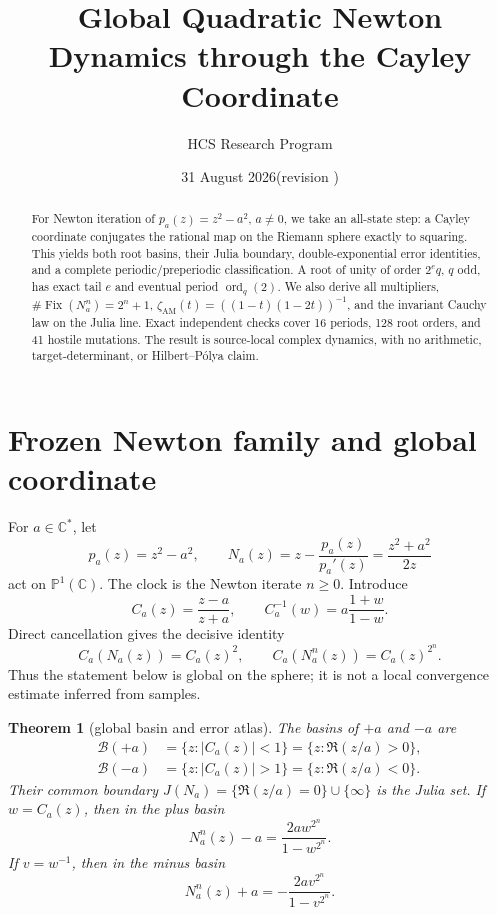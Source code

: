 \documentclass[10pt]{article}
\title{Global Quadratic Newton Dynamics through the Cayley Coordinate}
\author{HCS Research Program}
\date{31 August 2026\quad (revision \CRevisionRound)}
\newtheorem{theorem}{Theorem}
\newcommand{\C}{\mathbb C}
\newcommand{\PP}{\mathbb P^1(\C)}
\newcommand{\AM}{\mathrm{AM}}
\begin{document}
\maketitle
\begin{abstract}
For Newton iteration of \(p_a(z)=z^2-a^2\), \(a\ne0\), we take an all-state
step: a Cayley coordinate conjugates the rational map on the Riemann sphere
exactly to squaring.  This yields both root basins, their Julia boundary,
double-exponential error identities, and a complete periodic/preperiodic
classification.  A root of unity of order \(2^e q\), \(q\) odd, has exact
tail \(e\) and eventual period \(\operatorname{ord}_q(2)\).  We also derive all
multipliers, \(\#\operatorname{Fix}(N_a^n)=2^n+1\),
\(\zeta_{\AM}(t)=((1-t)(1-2t))^{-1}\), and the invariant Cauchy law on the
Julia line.  Exact independent checks cover 16 periods, 128 root orders, and
41 hostile mutations.  The result is source-local complex dynamics, with no
arithmetic, target-determinant, or Hilbert--Pólya claim.
\end{abstract}

\section{Frozen Newton family and global coordinate}
For \(a\in\C^*\), let
\begin{equation}
 p_a(z)=z^2-a^2,\qquad
 N_a(z)=z-\frac{p_a(z)}{p_a'(z)}=\frac{z^2+a^2}{2z}
 \label{eq:newton}
\end{equation}
act on \(\PP\).  The clock is the Newton iterate \(n\ge0\).  Introduce
\begin{equation}
 C_a(z)=\frac{z-a}{z+a},\qquad
 C_a^{-1}(w)=a\frac{1+w}{1-w}.
 \label{eq:cayley}
\end{equation}
Direct cancellation gives the decisive identity
\begin{equation}
 C_a\!\left(N_a(z)\right)=C_a(z)^2,
 \qquad C_a\!\left(N_a^n(z)\right)=C_a(z)^{2^n}.
 \label{eq:conjugacy}
\end{equation}
Thus the statement below is global on the sphere; it is not a local
convergence estimate inferred from samples.

\begin{theorem}[global basin and error atlas]
The basins of \(+a\) and \(-a\) are
\begin{align}
 \mathcal B(+a)&=\{z:|C_a(z)|<1\}=\{z:\Re(z/a)>0\},\\
 \mathcal B(-a)&=\{z:|C_a(z)|>1\}=\{z:\Re(z/a)<0\}.
\end{align}
Their common boundary
\(J(N_a)=\{\Re(z/a)=0\}\cup\{\infty\}\) is the Julia set.  If
\(w=C_a(z)\), then in the plus basin
\begin{equation}
 N_a^n(z)-a=\frac{2a w^{2^n}}{1-w^{2^n}}.
 \label{eq:pluserror}
\end{equation}
If \(v=w^{-1}\), then in the minus basin
\begin{equation}
 N_a^n(z)+a=-\frac{2a v^{2^n}}{1-v^{2^n}}.
 \label{eq:minuserror}
\end{equation}
\end{theorem}
\end{document}
